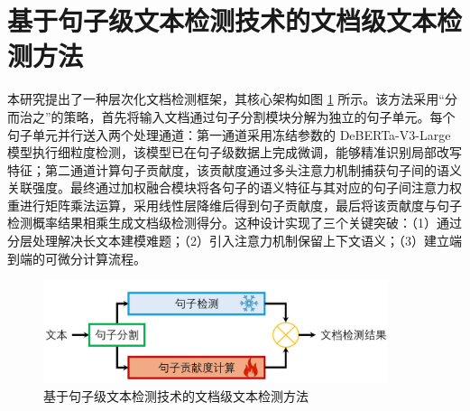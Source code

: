 


\section{基于句子级文本检测技术的文档级文本检测方法}
\label{sec:method-sent2arti}

本研究提出了一种层次化文档检测框架，其核心架构如图 \ref{fig:method-sent2arti} 所示。该方法采用“分而治之”的策略，首先将输入文档通过句子分割模块分解为独立的句子单元。每个句子单元并行送入两个处理通道：第一通道采用冻结参数的 DeBERTa-V3-Large 模型执行细粒度检测，该模型已在句子级数据上完成微调，能够精准识别局部改写特征；第二通道计算句子贡献度，该贡献度通过多头注意力机制捕获句子间的语义关联强度。最终通过加权融合模块将各句子的语义特征与其对应的句子间注意力权重进行矩阵乘法运算，采用线性层降维后得到句子贡献度，最后将该贡献度与句子检测概率结果相乘生成文档级检测得分。这种设计实现了三个关键突破：（1）通过分层处理解决长文本建模难题；（2）引入注意力机制保留上下文语义；（3）建立端到端的可微分计算流程。

\begin{figure}[htbp]
    \centering
    \includegraphics[width=0.9\textwidth]{figures/sent2arti.jpg}
    \caption{基于句子级文本检测技术的文档级文本检测方法}
    \label{fig:method-sent2arti}
\end{figure}

